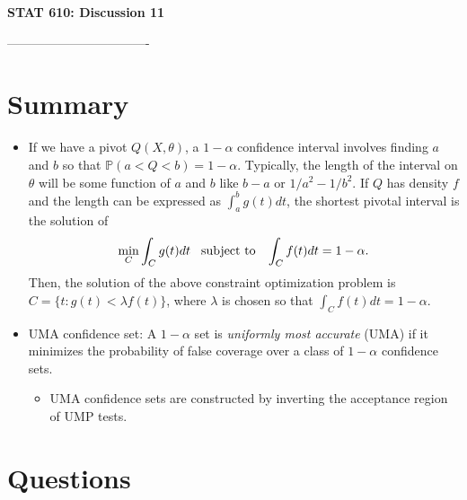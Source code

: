 \documentclass[12pt]{extarticle}
\newcommand{\p}{\mathbb P}
\begin{document}
	
	\begin{center}
		{\large \bf STAT 610: Discussion 11}
	\end{center}
	\vspace{0.22cm}
----------------------------------%


  

\section{Summary}
\begin{itemize}
	\item If we have a pivot $Q(X,\theta)$, a $1-\alpha$ confidence interval involves finding $a$ and $b$ so that $\p(a<Q<b) = 1-\alpha$. Typically, the length of the interval on $\theta$ will be some function of $a$ and $b$ like $b-a$ or $1/a^2 - 1/b^2$. If $Q$ has density $f$ and the length can be expressed as $\int_a^bg(t)dt$, the shortest pivotal interval is the solution of 
	$$\min_{C}\int_C g(t)dt \hspace{3mm} \text{subject to}  \hspace{3mm} \int_C f(t)dt = 1-\alpha.$$
	Then, the solution of the above constraint optimization problem is $C = \{t: g(t)<\lambda f(t)\}$, where $\lambda$ is chosen so that $\int_C f(t)dt = 1-\alpha$.
	\item UMA confidence set: A $1 - \alpha$ set is \textit{uniformly most accurate} (UMA) if it minimizes the probability of false coverage over a class of $1-\alpha$ confidence sets.
	\begin{itemize}
		\item UMA confidence sets are constructed by inverting the acceptance region of UMP tests.
	\end{itemize}
\end{itemize}

\section{Questions}
 
\end{document}
